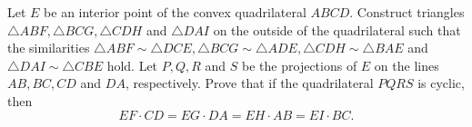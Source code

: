 Let $E$ be an interior point of the convex quadrilateral $ABCD$. Construct triangles $\triangle ABF,\triangle BCG,\triangle CDH$ and $\triangle DAI$ on the outside of the quadrilateral such that the similarities $\triangle ABF\sim\triangle DCE,\triangle BCG\sim \triangle ADE,\triangle CDH\sim\triangle BAE$ and $ \triangle DAI\sim\triangle CBE$ hold. Let $P,Q,R$ and $S$ be the projections of $E$ on the lines $AB,BC,CD$ and $DA$,  respectively. Prove that if the quadrilateral $PQRS$ is cyclic, then\[EF\cdot CD=EG\cdot DA=EH\cdot AB=EI\cdot BC.\]